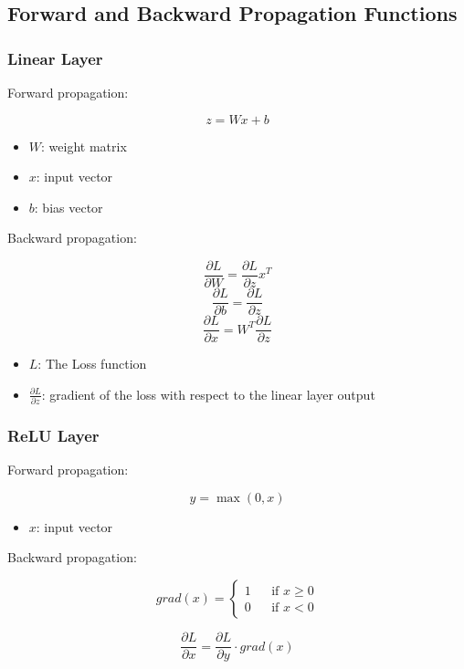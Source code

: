 \subsection{Forward and Backward Propagation Functions}

\subsubsection{Linear Layer}

Forward propagation:

$$
z = Wx + b
$$

\begin{itemize}
    \item $W$: weight matrix
    \item $x$: input vector
    \item $b$: bias vector
\end{itemize}

Backward propagation:

$$ \frac{\partial L}{\partial W} = \frac{\partial L}{\partial z} x^T $$
$$ \frac{\partial L}{\partial b} = \frac{\partial L}{\partial z} $$
$$ \frac{\partial L}{\partial x} = W^T \frac{\partial L}{\partial z} $$


\begin{itemize}
    \item $L$: The Loss function
    \item $\frac{\partial L}{\partial z}$: gradient of the loss with respect to the linear layer output
\end{itemize}


\subsubsection{ReLU Layer}

Forward propagation:

$$ y = \max(0, x) $$

\begin{itemize}
    \item $x$: input vector
\end{itemize}

Backward propagation:

$$
grad(x)=
\left\{
    \begin{aligned}
        1 && \text{if $x \geq 0$}\\
        0 && \text{if $x < 0$}
    \end{aligned}
\right.
$$

$$ \frac{\partial L}{\partial x} = \frac{\partial L}{\partial y} \cdot grad(x) $$

